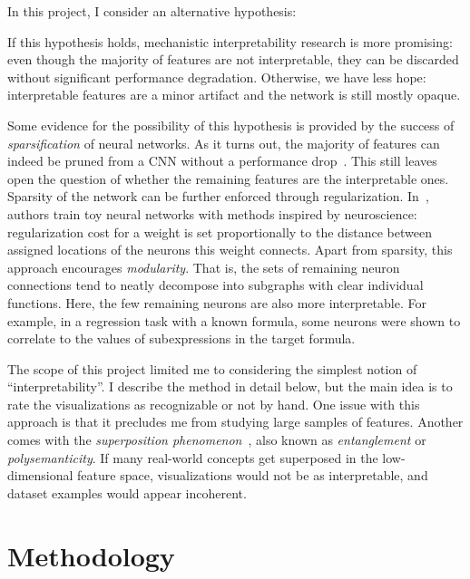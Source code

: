 \documentclass[12pt]{article}
\begin{document}
In this project, I consider an alternative hypothesis:

\noindent{}

If this hypothesis holds, mechanistic interpretability research is more promising: even though the majority of features are not interpretable, they can be discarded without significant performance degradation. Otherwise, we have less hope: interpretable features are a minor artifact and the network is still mostly opaque. 

Some evidence for the possibility of this hypothesis is provided by the success of \emph{sparsification} of neural networks. As it turns out, the majority of features can indeed be pruned from a CNN without a performance drop~\cite{anwar2017structured}. This still leaves open the question of whether the remaining features are the interpretable ones. Sparsity of the network can be further enforced through regularization. In~\cite{liu2023seeing}, authors train toy neural networks with methods inspired by neuroscience: regularization cost for a weight is set proportionally to the distance between assigned locations of the neurons this weight connects. Apart from sparsity, this approach encourages \emph{modularity}. That is, the sets of remaining neuron connections tend to neatly decompose into subgraphs with clear individual functions. Here, the few remaining neurons are also more interpretable. For example, in a regression task with a known formula, some neurons were shown to correlate to the values of subexpressions in the target formula.

The scope of this project limited me to considering the simplest notion of ``interpretability''. I describe the method in detail below, but the main idea is to rate the visualizations as recognizable or not by hand. One issue with this approach is that it precludes me from studying large samples of features. Another comes with the \emph{superposition phenomenon}~\cite{elhage2022toy}, also known as \emph{entanglement} or \emph{polysemanticity}. If many real-world concepts get superposed in the low-dimensional feature space, visualizations would not be as interpretable, and dataset examples would appear incoherent.

\section{Methodology}
\end{document}
